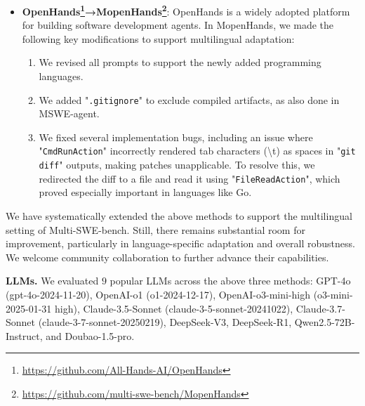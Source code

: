\documentclass[11pt, a4paper, logo, copyright, nonumbering]{seed}
\newcommand{\multiswebench}{Multi-SWE-bench\xspace}
\newcommand{\sweagent}{SWE-agent\xspace}
\newcommand{\msweagent}{MSWE-agent\xspace}
\newcommand{\openhands}{OpenHands\xspace}
\newcommand{\mopenhands}{MopenHands\xspace}
\begin{document}
\begin{itemize}[leftmargin=*]
    \sweagent is an agent-based approach that solves issues through multi-turn interactions via a predefined agent-computer interface (ACI).
    To support \multiswebench, we developed \msweagent with the following modifications:
    \begin{enumerate}
    \item We revised all prompts to accommodate the newly added languages.
    \item We truncated overly long environment observations to ensure stable agent execution.
    \item We added "\texttt{.gitignore}" to exclude compiled artifacts (e.g., "\texttt{.o}", "\texttt{.bin}") in languages like C/C++, which could otherwise interfere with "\texttt{git apply}".
    \item We fixed language-specific commands that caused crashes or non-terminating behavior during execution to ensure stable agent execution.
\end{enumerate}
    \item \textbf{\openhands\footnote{\url{https://github.com/All-Hands-AI/OpenHands}}→\mopenhands\footnote{\url{https://github.com/multi-swe-bench/MopenHands}}}: 
    \openhands is a widely adopted platform for building software development agents.
    In \mopenhands, we made the following key modifications to support multilingual adaptation:
    \begin{enumerate}
    \item We revised all prompts to support the newly added programming languages.
    \item We added "\texttt{.gitignore}" to exclude compiled artifacts, as also done in \msweagent.
    \item We fixed several implementation bugs, including an issue where "\texttt{CmdRunAction}" incorrectly rendered tab characters (\textbackslash t) as spaces in "\texttt{git diff}" outputs, making patches unapplicable. To resolve this, we redirected the diff to a file and read it using "\texttt{FileReadAction}", which proved especially important in languages like Go.
\end{enumerate}
\end{itemize}
We have systematically extended the above methods to support the multilingual setting of \multiswebench. 
Still, there remains substantial room for improvement, particularly in language-specific adaptation and overall robustness.
We welcome community collaboration to further advance their capabilities.

\noindent\textbf{LLMs.}
We evaluated $9$ popular LLMs across the above three methods: GPT-4o (gpt-4o-2024-11-20), OpenAI-o1 (o1-2024-12-17), OpenAI-o3-mini-high (o3-mini-2025-01-31 high), Claude-3.5-Sonnet (claude-3-5-sonnet-20241022), Claude-3.7-Sonnet (claude-3-7-sonnet-20250219), DeepSeek-V3, DeepSeek-R1, Qwen2.5-72B-Instruct, and Doubao-1.5-pro.
\end{document}
